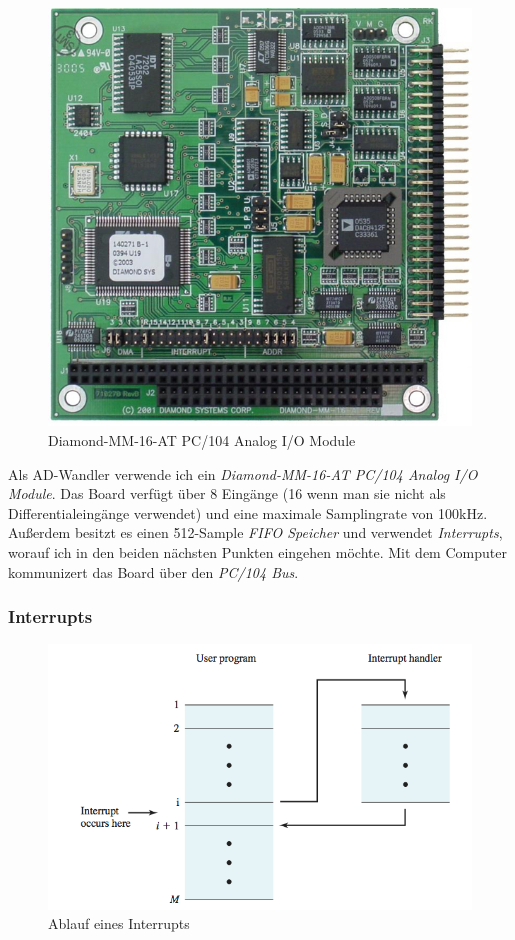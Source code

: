 \documentclass[12pt,a4paper]{scrartcl}
\begin{document}
\begin{figure}[H]
\centering
\includegraphics[scale=.4]{hardwareimages/diamondmm16at.jpg}
\caption{Diamond-MM-16-AT PC/104 Analog I/O Module}
\label{diamond}
\end{figure}



Als AD-Wandler verwende ich ein \textit{Diamond-MM-16-AT PC/104 Analog I/O Module}. Das Board verfügt über 8 Eingänge (16 wenn man sie nicht als Differentialeingänge verwendet) und eine maximale Samplingrate von 100kHz. Außerdem besitzt es einen 512-Sample \textit{FIFO Speicher} und verwendet \textit{Interrupts}, worauf ich in den beiden nächsten Punkten eingehen möchte.
Mit dem Computer kommunizert das Board über den \textit{PC/104 Bus}.


\subsubsection{Interrupts}

\begin{figure}[H]
\centering
\includegraphics[scale=1.4]{interrupt.png}
\caption{Ablauf eines Interrupts \citep{Stallings:2000uq}}
\label{interrupt}
\end{figure}
\end{document}
